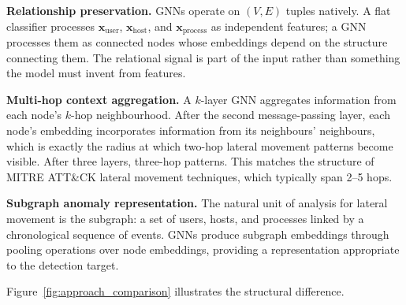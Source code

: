 \documentclass[sigconf,nonacm]{acmart}
\begin{document}
\textbf{Relationship preservation.} GNNs operate on $(V, E)$ tuples natively.
A flat classifier processes
$\mathbf{x}_{\text{user}}$, $\mathbf{x}_{\text{host}}$, and
$\mathbf{x}_{\text{process}}$ as independent features; a GNN processes them
as connected nodes whose embeddings depend on the structure connecting them.
The relational signal is part of the input rather than something the model
must invent from features.

\textbf{Multi-hop context aggregation.} A $k$-layer GNN aggregates
information from each node's $k$-hop neighbourhood. After the second message-passing
layer, each node's embedding incorporates information from its neighbours'
neighbours, which is exactly the radius at which two-hop lateral movement
patterns become visible. After three layers, three-hop patterns. This
matches the structure of MITRE ATT\&CK lateral movement techniques, which
typically span 2--5 hops.

\textbf{Subgraph anomaly representation.} The natural unit of analysis for
lateral movement is the subgraph: a set of users, hosts, and processes
linked by a chronological sequence of events. GNNs produce subgraph embeddings
through pooling operations over node embeddings, providing a representation
appropriate to the detection target.

Figure~\ref{fig:approach_comparison} illustrates the structural difference.
\end{document}
